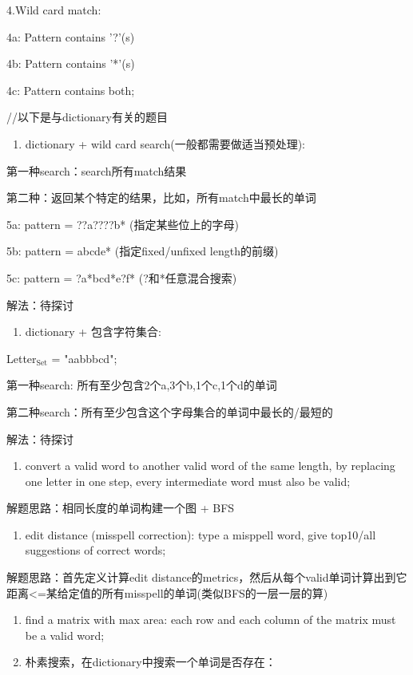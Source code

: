 \documentclass[12pt]{book}
\begin{document}
4.Wild card match:

4a: Pattern contains '?'(s)

4b: Pattern contains '*'(s)

4c: Pattern contains both;

//以下是与dictionary有关的题目
\begin{enumerate}
\item dictionary + wild card search(一般都需要做适当预处理):
\end{enumerate}

第一种search：search所有match结果

第二种：返回某个特定的结果，比如，所有match中最长的单词

5a: pattern = ??a????b* (指定某些位上的字母)

5b: pattern = abcde* (指定fixed/unfixed length的前缀)

5c: pattern = ?a*bcd*e?f* (?和*任意混合搜索)

解法：待探讨

\begin{enumerate}
\item dictionary + 包含字符集合:
\end{enumerate}

Letter$_{\text{Set}}$ = "aabbbcd";

第一种search: 所有至少包含2个a,3个b,1个c,1个d的单词

第二种search：所有至少包含这个字母集合的单词中最长的/最短的

解法：待探讨

\begin{enumerate}
\item convert a valid word to another valid word of the same length, by replacing one letter in one step, every intermediate word must also be valid;
\end{enumerate}

解题思路：相同长度的单词构建一个图 + BFS

\begin{enumerate}
\item edit distance (misspell correction): type a misppell word, give top10/all suggestions of correct words;
\end{enumerate}

解题思路：首先定义计算edit distance的metrics，然后从每个valid单词计算出到它距离<=某给定值的所有misspell的单词(类似BFS的一层一层的算)

\begin{enumerate}
\item find a matrix with max area: each row and each column of the matrix must be a valid word;

\item 朴素搜索，在dictionary中搜索一个单词是否存在：
\end{enumerate}
\end{document}
